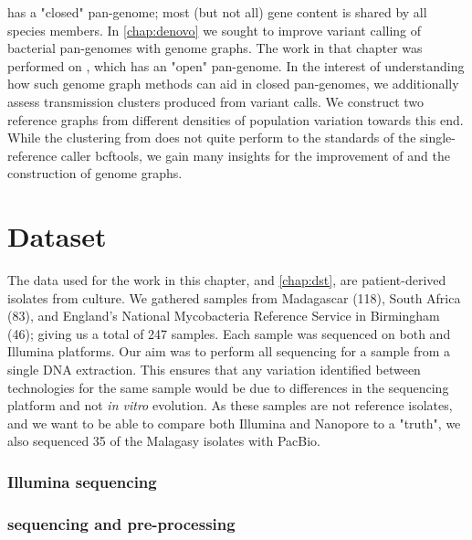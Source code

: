 \mtb{} has a "closed" pan-genome; most (but not all) gene content is shared by all species members. In \autoref{chap:denovo} we sought to improve variant calling of bacterial pan-genomes with genome graphs. The work in that chapter was performed on \ecoli{}, which has an "open" pan-genome. In the interest of understanding how such genome graph methods can aid in closed pan-genomes, we additionally assess transmission clusters produced from \pandora{} variant calls. We construct two \mtb{} reference graphs from different densities of population variation towards this end. While the clustering from \pandora{} does not quite perform to the standards of the single-reference caller bcftools, we gain many insights for the improvement of \pandora{} and the construction of genome graphs.


\section{Dataset}
\label{sec:dataset}

The data used for the work in this chapter, and \autoref{chap:dst}, are patient-derived \mtb{} isolates from culture. We gathered samples from Madagascar (118), South Africa (83), and England's National Mycobacteria Reference Service in Birmingham (46); giving us a total of 247 samples.  
Each sample was sequenced on both \ont{} and Illumina platforms. Our aim was to perform all sequencing for a sample from a single DNA extraction. This ensures that any variation identified between technologies for the same sample would be due to differences in the sequencing platform and not \textit{in vitro} evolution.  
As these samples are not reference isolates, and we want to be able to compare both Illumina and Nanopore to a "truth", we also sequenced 35 of the Malagasy isolates with PacBio.

\subsubsection{Illumina sequencing}


\subsubsection{\ont{} sequencing and pre-processing}


